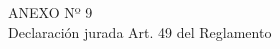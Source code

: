 \begin{center}
    \vspace*{\fill} %
    \Huge %
    ANEXO Nº 9 \\
    Declaración jurada Art. 49 del Reglamento
    \vspace*{\fill} %
\end{center}